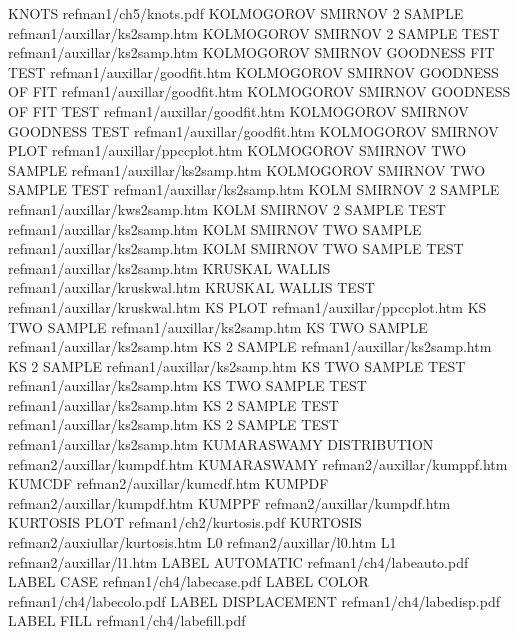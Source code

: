 KNOTS                                   refman1/ch5/knots.pdf
KOLMOGOROV SMIRNOV 2 SAMPLE             refman1/auxillar/ks2samp.htm
KOLMOGOROV SMIRNOV 2 SAMPLE TEST        refman1/auxillar/ks2samp.htm
KOLMOGOROV SMIRNOV GOODNESS FIT TEST    refman1/auxillar/goodfit.htm
KOLMOGOROV SMIRNOV GOODNESS OF FIT      refman1/auxillar/goodfit.htm
KOLMOGOROV SMIRNOV GOODNESS OF FIT TEST refman1/auxillar/goodfit.htm
KOLMOGOROV SMIRNOV GOODNESS TEST        refman1/auxillar/goodfit.htm
KOLMOGOROV SMIRNOV PLOT                 refman1/auxillar/ppccplot.htm
KOLMOGOROV SMIRNOV TWO SAMPLE           refman1/auxillar/ks2samp.htm
KOLMOGOROV SMIRNOV TWO SAMPLE TEST      refman1/auxillar/ks2samp.htm
KOLM SMIRNOV 2 SAMPLE                   refman1/auxillar/kws2samp.htm
KOLM SMIRNOV 2 SAMPLE TEST              refman1/auxillar/ks2samp.htm
KOLM SMIRNOV TWO SAMPLE                 refman1/auxillar/ks2samp.htm
KOLM SMIRNOV TWO SAMPLE TEST            refman1/auxillar/ks2samp.htm
KRUSKAL WALLIS                          refman1/auxillar/kruskwal.htm
KRUSKAL WALLIS TEST                     refman1/auxillar/kruskwal.htm
KS PLOT                                 refman1/auxillar/ppccplot.htm
KS TWO SAMPLE                           refman1/auxillar/ks2samp.htm
KS TWO SAMPLE                           refman1/auxillar/ks2samp.htm
KS 2 SAMPLE                             refman1/auxillar/ks2samp.htm
KS 2 SAMPLE                             refman1/auxillar/ks2samp.htm
KS TWO SAMPLE TEST                      refman1/auxillar/ks2samp.htm
KS TWO SAMPLE TEST                      refman1/auxillar/ks2samp.htm
KS 2 SAMPLE TEST                        refman1/auxillar/ks2samp.htm
KS 2 SAMPLE TEST                        refman1/auxillar/ks2samp.htm
KUMARASWAMY DISTRIBUTION                refman2/auxillar/kumpdf.htm
KUMARASWAMY                             refman2/auxillar/kumppf.htm
KUMCDF                                  refman2/auxillar/kumcdf.htm
KUMPDF                                  refman2/auxillar/kumpdf.htm
KUMPPF                                  refman2/auxillar/kumpdf.htm
KURTOSIS PLOT                           refman1/ch2/kurtosis.pdf
KURTOSIS                                refman2/auxiullar/kurtosis.htm
L0                                      refman2/auxillar/l0.htm
L1                                      refman2/auxillar/l1.htm
LABEL AUTOMATIC                         refman1/ch4/labeauto.pdf
LABEL CASE                              refman1/ch4/labecase.pdf
LABEL COLOR                             refman1/ch4/labecolo.pdf
LABEL DISPLACEMENT                      refman1/ch4/labedisp.pdf
LABEL FILL                              refman1/ch4/labefill.pdf

